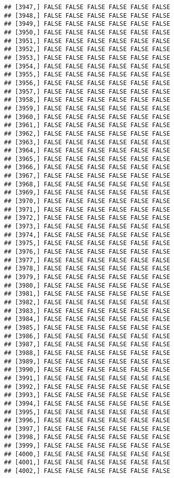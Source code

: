 \documentclass[
]{article}
\begin{document}
\begin{verbatim}
## [3947,] FALSE FALSE FALSE FALSE FALSE FALSE
## [3948,] FALSE FALSE FALSE FALSE FALSE FALSE
## [3949,] FALSE FALSE FALSE FALSE FALSE FALSE
## [3950,] FALSE FALSE FALSE FALSE FALSE FALSE
## [3951,] FALSE FALSE FALSE FALSE FALSE FALSE
## [3952,] FALSE FALSE FALSE FALSE FALSE FALSE
## [3953,] FALSE FALSE FALSE FALSE FALSE FALSE
## [3954,] FALSE FALSE FALSE FALSE FALSE FALSE
## [3955,] FALSE FALSE FALSE FALSE FALSE FALSE
## [3956,] FALSE FALSE FALSE FALSE FALSE FALSE
## [3957,] FALSE FALSE FALSE FALSE FALSE FALSE
## [3958,] FALSE FALSE FALSE FALSE FALSE FALSE
## [3959,] FALSE FALSE FALSE FALSE FALSE FALSE
## [3960,] FALSE FALSE FALSE FALSE FALSE FALSE
## [3961,] FALSE FALSE FALSE FALSE FALSE FALSE
## [3962,] FALSE FALSE FALSE FALSE FALSE FALSE
## [3963,] FALSE FALSE FALSE FALSE FALSE FALSE
## [3964,] FALSE FALSE FALSE FALSE FALSE FALSE
## [3965,] FALSE FALSE FALSE FALSE FALSE FALSE
## [3966,] FALSE FALSE FALSE FALSE FALSE FALSE
## [3967,] FALSE FALSE FALSE FALSE FALSE FALSE
## [3968,] FALSE FALSE FALSE FALSE FALSE FALSE
## [3969,] FALSE FALSE FALSE FALSE FALSE FALSE
## [3970,] FALSE FALSE FALSE FALSE FALSE FALSE
## [3971,] FALSE FALSE FALSE FALSE FALSE FALSE
## [3972,] FALSE FALSE FALSE FALSE FALSE FALSE
## [3973,] FALSE FALSE FALSE FALSE FALSE FALSE
## [3974,] FALSE FALSE FALSE FALSE FALSE FALSE
## [3975,] FALSE FALSE FALSE FALSE FALSE FALSE
## [3976,] FALSE FALSE FALSE FALSE FALSE FALSE
## [3977,] FALSE FALSE FALSE FALSE FALSE FALSE
## [3978,] FALSE FALSE FALSE FALSE FALSE FALSE
## [3979,] FALSE FALSE FALSE FALSE FALSE FALSE
## [3980,] FALSE FALSE FALSE FALSE FALSE FALSE
## [3981,] FALSE FALSE FALSE FALSE FALSE FALSE
## [3982,] FALSE FALSE FALSE FALSE FALSE FALSE
## [3983,] FALSE FALSE FALSE FALSE FALSE FALSE
## [3984,] FALSE FALSE FALSE FALSE FALSE FALSE
## [3985,] FALSE FALSE FALSE FALSE FALSE FALSE
## [3986,] FALSE FALSE FALSE FALSE FALSE FALSE
## [3987,] FALSE FALSE FALSE FALSE FALSE FALSE
## [3988,] FALSE FALSE FALSE FALSE FALSE FALSE
## [3989,] FALSE FALSE FALSE FALSE FALSE FALSE
## [3990,] FALSE FALSE FALSE FALSE FALSE FALSE
## [3991,] FALSE FALSE FALSE FALSE FALSE FALSE
## [3992,] FALSE FALSE FALSE FALSE FALSE FALSE
## [3993,] FALSE FALSE FALSE FALSE FALSE FALSE
## [3994,] FALSE FALSE FALSE FALSE FALSE FALSE
## [3995,] FALSE FALSE FALSE FALSE FALSE FALSE
## [3996,] FALSE FALSE FALSE FALSE FALSE FALSE
## [3997,] FALSE FALSE FALSE FALSE FALSE FALSE
## [3998,] FALSE FALSE FALSE FALSE FALSE FALSE
## [3999,] FALSE FALSE FALSE FALSE FALSE FALSE
## [4000,] FALSE FALSE FALSE FALSE FALSE FALSE
## [4001,] FALSE FALSE FALSE FALSE FALSE FALSE
## [4002,] FALSE FALSE FALSE FALSE FALSE FALSE

\end{verbatim}
\end{document}

